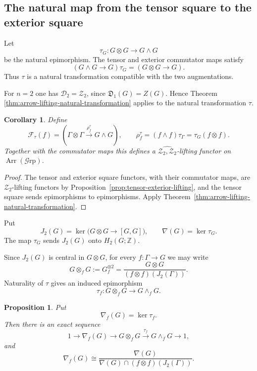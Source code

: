 \documentclass[10pt]{amsart}
\newtheorem{proposition}[theorem]{Proposition}
\newtheorem{corollary}[theorem]{Corollary}
\renewcommand{\*}{\cdot {\dots} \cdot}
\newcommand{\?}[1]{\overset{?}{#1}}
\newcommand{\Grp}{\mathcal{G}\text{rp}}
\numberwithin{equation}{section}
\begin{document}
\subsection{The natural map from the tensor square to the exterior square}

Let
\[
\tau_G\colon G\otimes G\longrightarrow G\wedge G
\]
be the natural epimorphism. The tensor and exterior commutator
maps satisfy
\[
(G\wedge G\longrightarrow G)\tau_G
=
(G\otimes G\longrightarrow G).
\]
Thus $\tau$ is a natural transformation compatible with the two
augmentations.

For $n=2$ one has $\mathcal D_2=\mathcal Z_2$, since
$\mathfrak D_1(G)=Z(G)$. Hence Theorem~
\ref{thm:arrow-lifting-natural-transformation} applies to the
natural transformation $\tau$.

\begin{corollary}\label{cor:tensor-exterior-arrow-lifting}
Define
\[
\mathscr F_\tau(f)=
\left(
\Gamma\otimes\Gamma
\xrightarrow{\rho_f^\tau}
G\wedge G
\right),
\qquad
\rho_f^\tau=(f\wedge f)\tau_\Gamma
=\tau_G(f\otimes f).
\]
Together with the commutator maps this defines a
$\widehat{\mathcal Z_2,\mathcal Z_2}$-lifting functor on
$\operatorname{Arr}(\Grp)$.
\end{corollary}

\begin{proof}
The tensor and exterior square functors, with their commutator
maps, are $\mathcal Z_2$-lifting functors by
Proposition~\ref{prop:tensor-exterior-lifting}, and the tensor
square sends epimorphisms to epimorphisms. Apply
Theorem~\ref{thm:arrow-lifting-natural-transformation}.
\end{proof}

Put
\[
J_2(G)=\ker\bigl(G\otimes G\longrightarrow[G,G]\bigr),
\qquad
\nabla(G)=\ker\tau_G.
\]
The map $\tau_G$ sends $J_2(G)$ onto $H_2(G;\mathbb Z)$.

Since $J_2(G)$ is central in $G\otimes G$, for every
$f\colon\Gamma\to G$ we may write
\[
G\otimes_fG
:=G_f^{\otimes2}
=
\frac{G\otimes G}{(f\otimes f)(J_2(\Gamma))}.
\]
Naturality of $\tau$ gives an induced epimorphism
\[
\tau_f\colon G\otimes_fG\longrightarrow G\wedge_fG.
\]

\begin{proposition}\label{prop:relative-tensor-exterior-map}
Put
\[
\nabla_f(G)=\ker\tau_f.
\]
Then there is an exact sequence
\[
1\longrightarrow\nabla_f(G)
\longrightarrow G\otimes_fG
\xrightarrow{\,\tau_f\,}G\wedge_fG
\longrightarrow1,
\]
and
\[
\nabla_f(G)
\cong
\frac{\nabla(G)}
{\nabla(G)\cap(f\otimes f)(J_2(\Gamma))}.
\]
\end{proposition}
\end{document}
